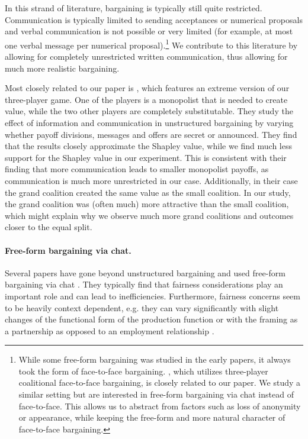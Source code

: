 \documentclass[12pt]{article}
\begin{document}
In this strand of literature, bargaining is typically still quite restricted. Communication is typically limited to sending acceptances or numerical proposals and verbal communication is not possible or very limited (for example, at most one verbal message per numerical proposal).\footnote{While some free-form bargaining was studied in the early papers, it always took the form of face-to-face bargaining. \textcite{LeopoldWildburger1992}, which utilizes three-player coalitional face-to-face bargaining, is closely related to our paper. We study a similar setting but are interested in free-form bargaining via chat instead of face-to-face. This allows us to abstract from factors such as loss of anonymity or appearance, while keeping the free-form and more natural character of face-to-face bargaining.} We contribute to this literature by allowing for completely unrestricted written communication, thus allowing for much more realistic bargaining. 

Most closely related to our paper is \textcite{MurnighanRoth1977}, which features an extreme version of our three-player game. One of the players is a monopolist that is needed to create value, while the two other players are completely substitutable. They study the effect of information and communication in unstructured bargaining by varying whether payoff divisions, messages and offers are secret or announced. They find that the results closely approximate the Shapley value, while we find much less support for the Shapley value in our experiment. This is consistent with their finding that more communication leads to smaller monopolist payoffs, as communication is much more unrestricted in our case. Additionally, in their case the grand coalition created the same value as the small coalition. In our study, the grand coalition was (often much) more attractive than the small coalition, which might explain why we observe much more grand coalitions and outcomes closer to the equal split.


\paragraph{Free-form bargaining via chat.}

Several papers have gone beyond unstructured bargaining and used free-form bargaining via chat \parencite{LuhanPoulsenRoos2019, Galeottietal2018, HossainLyonsSiow2020, NavarroVeszteg2020, ShinodaFunaki2022, Schwaninger2022, Takeuchietal2022}. They typically find that fairness considerations play an important role and can lead to inefficiencies. Furthermore, fairness concerns seem to be heavily context dependent, e.g. they can vary significantly with slight changes of the functional form of the production function \parencite[]{Takeuchietal2022} or with the framing as a partnership as opposed to an employment relationship \parencite{HossainLyonsSiow2020}.
\end{document}
